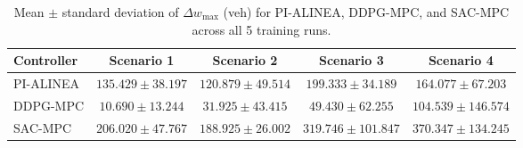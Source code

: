 \begin{table}[htbp]
\centering
\caption{Mean $\pm$ standard deviation of $\Delta w_{\max}$ (veh) for PI-ALINEA, DDPG-MPC, and SAC-MPC across all 5 training runs.}
\label{tab:dw_max_multi}
\begin{tabular}{lcccc}
\toprule
Controller & Scenario 1 & Scenario 2 & Scenario 3 & Scenario 4 \\
\midrule
PI-ALINEA & $135.429 \pm 38.197$ & $120.879 \pm 49.514$ & $199.333 \pm 34.189$ & $164.077 \pm 67.203$ \\
DDPG-MPC & $10.690 \pm 13.244$ & $31.925 \pm 43.415$ & $49.430 \pm 62.255$ & $104.539 \pm 146.574$ \\
SAC-MPC & $206.020 \pm 47.767$ & $188.925 \pm 26.002$ & $319.746 \pm 101.847$ & $370.347 \pm 134.245$ \\
\bottomrule
\end{tabular}
\end{table}
